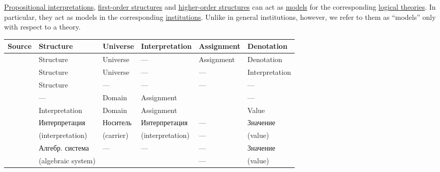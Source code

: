 \begin{remark}\label{rem:model_theory_structure_terminology}
  \hyperref[def:propositional_interpretation]{Propositional interpretations}, \hyperref[def:fol_structure]{first-order structures} and \hyperref[def:hol_structure]{higher-order structures} can act as \hyperref[con:logical_model]{models} for the corresponding \hyperref[def:logical_theory]{logical theories}. In particular, they act as models in the corresponding \hyperref[def:institution]{institutions}. Unlike in general institutions, however, we refer to them as \enquote{models} only with respect to a theory.

  \begin{table}
    \centering
    \scriptsize
    \begin{tabular}{*{6}{l}}
      \toprule
      Source                                                      & Structure          & Universe    & Interpretation   & Assignment & Denotation     \\
      \midrule
      \cite[ch. 2]{Hinman2005Logic}                               & Structure          & Universe    & ---              & Assignment & Denotation     \\
      \cite[ch. 2]{VanDalen2004LogicAndStructure}                 & Structure          & Universe    & ---              & ---        & Interpretation \\
      \cite[\S 13.6.1]{TroelstraVanDalen1988ConstructivismVol2}   & Structure          & ---         & ---              & ---        & ---            \\
      \cite[84]{Kleene2002Logic}                                  & ---                & Domain      & Assignment       &            & ---            \\
      \cite[115]{Andrews2002Logic}                                & Interpretation     & Domain      & Assignment       &            & Value          \\
      \cite[70, 72, 73]{КолмогоровДрагалин2006ЛогикаВведение}             & Интерпретация      & Носитель    & Интерпретация    & ---        & Значение       \\
                                                                  & (interpretation)   & (carrier)   & (interpretation) & ---        & (value)        \\
      \cite[142]{Мальцев1970АлгебраическиеСистемы}                & Алгебр. система    & ---         & ---              & ---        & Значение       \\
                                                                  & (algebraic system) &             &                  & ---        & (value)        \\

\end{tabular}
\end{table}
\end{remark}

